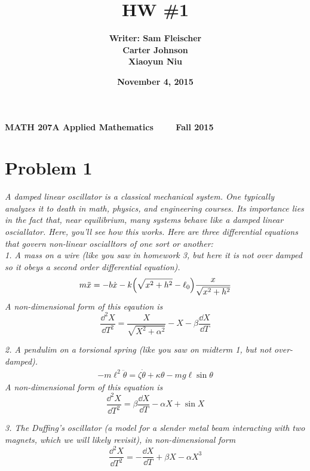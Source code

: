 \documentclass[12pt]{article}
\title{\bf HW \#1}
\author{\bf Writer: Sam Fleischer \\ \bf Carter Johnson \\ \bf Xiaoyun Niu}
\date{\bf November 4, 2015}
\begin{document}
{\bf MATH 207A \hfill Applied Mathematics \ \ \ \ \hfill Fall 2015} 

{\let\newpage\relax\maketitle}

\section*{Problem 1}
\emph{A damped linear oscillator is a classical mechanical system.  One typically analyzes it to death in math, physics, and engineering courses.  Its importance lies in the fact that, near equilibrium, many systems behave like a damped linear osciallator.  Here, you'll see how this works.  Here are three differential equations that govern non-linear oscialltors of one sort or another:} \\

\noindent\emph{1. A mass on a wire (like you saw in homework 3, but here it is not over damped so it obeys a second order differential equation).}
\begin{align*}
	m\ddot{x} = -b\dot{x} - k\qty(\sqrt{x^2 + h^2} - \ell_0)\frac{x}{\sqrt{x^2 + h^2}}
\end{align*}
\emph{A non-dimensional form of this eqaution is}
\begin{equation}
	\label{mass_on_wire}
	\frac{\dd^2 X}{\dd T^2} = \frac{X}{\sqrt{X^2 + \alpha^2}} - X - \beta\frac{\dd X}{\dd T}
\end{equation}

\noindent\emph{2. A pendulim on a torsional spring (like you saw on midterm 1, but not over-damped).}
\begin{align*}
	-m\ell^2 \ddot{\theta} = \zeta\dot{\theta} + \kappa\theta - mg\ell\sin{\theta}
\end{align*}
\emph{A non-dimensional form of this equation is}
\begin{equation}
	\label{pendulum_torsional_spring}
	\frac{\dd^2 X}{\dd T^2} = \beta\frac{\dd X}{\dd T} - \alpha X + \sin{X}
\end{equation}

\noindent\emph{3. The Duffing's oscillator (a model for a slender metal beam interacting with two magnets, which we will likely revisit), in non-dimensional form}
\begin{equation}
	\label{duffings_oscillator}
	\frac{\dd^2 X}{\dd T^2} = -\frac{\dd X}{\dd T} + \beta X - \alpha X^3
\end{equation}
\end{document}
